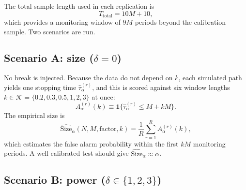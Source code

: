 \documentclass[12pt]{article}
\begin{document}
The total sample length used in each replication is
\begin{equation}
T_{\text{total}} = 10M + 10,
\label{eq:Ttotal}
\end{equation}
which provides a monitoring window of $9M$ periods beyond the calibration
sample. Two scenarios are run.

\subsection{Scenario A: size ($\delta=0$)}
\label{subsec:scenarioA}

No break is injected. Because the data do not depend on $k$, each
simulated path yields one stopping time $\hat\tau_\alpha^{(r)}$, and
this is scored against six window lengths
$k\in\mathcal{K}=\{0.2,0.3,0.5,1,2,3\}$ at once:
\begin{equation}
A_\alpha^{(r)}(k) \equiv
\mathbf{1}\bigl\{\hat\tau_\alpha^{(r)} \le M + kM\bigr\}.
\label{eq:Aindicator}
\end{equation}
The empirical size is
\begin{equation}
\widehat{\mathrm{Size}}_\alpha(N,M,\mathrm{factor},k)
= \frac{1}{R}\sum_{r=1}^{R} A_\alpha^{(r)}(k),
\label{eq:size}
\end{equation}
which estimates the false alarm probability within the first $kM$ monitoring
periods. A well-calibrated test should give
$\widehat{\mathrm{Size}}_\alpha \approx \alpha$.

\subsection{Scenario B: power ($\delta\in\{1,2,3\}$)}
\label{subsec:scenarioB}
\end{document}
